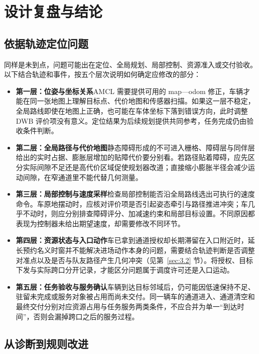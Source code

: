 \clearpage

\section{设计复盘与结论}\label{sec:7}

\subsection{依据轨迹定位问题}\label{sec:7.1}

同样是未到点，问题可能出在定位、全局规划、局部控制、资源准入或交付验收。以下结合轨迹和事件，按五个层次说明如何确定应修改的部分：
\begin{itemize}
\item \textbf{第一层：位姿与坐标关系}\quad AMCL 需要提供可用的 map—odom 修正，车辆才能在同一张地图上理解目标点、代价地图和传感器扫描。如果这一层不稳定，全局路线即使在地图上正确，也可能在车体坐标下落到错误方向，此时调整 DWB 评价项没有意义。定位结果为后续规划提供共同参考，任务完成仍由验收条件判断。
\item \textbf{第二层：全局路径与代价地图}\quad 静态障碍形成的不可进入栅格、障碍层与同伴层给出的实时占据、膨胀层增加的贴障代价要分别看。若路径贴着障碍，应先区分实际间隙不足还是高代价区域促使规划器改道；直接缩小膨胀半径会减少运动间隙，在窄通道里不能代替几何测量。
\item \textbf{第三层：局部控制与速度采样}\quad 检查局部控制能否沿全局路线选出可执行的速度命令。车原地摆动时，应核对评价项是否引起姿态牵引与路径推进冲突；车几乎不动时，则应分别排查障碍评分、加减速约束和局部目标设置。不同原因都表现为控制器未给出期望速度，却需要修改不同环节。
\item \textbf{第四层：资源状态与入口动作}\quad 车已拿到通道授权却长期滞留在入口附近时，延长预约名义时窗并不能解决进场动作本身的问题，需要结合轨迹判断是否调整对准点以及是否与队友路径产生几何冲突（见第~\ref{sec:3.2} 节）。将授权、目标下发与实际跨口分开记录，才能区分问题属于调度许可还是入口运动。
\item \textbf{第五层：任务验收与服务确认}\quad 车辆到达目标邻域后，仍可能因低速保持不足、驻留未完成或服务对象被占用而尚未交付。同一辆车的通道进入、通道清空和最终交付分别对应资源占用与任务服务两类条件，不应合并为单一“到达时间”，否则会漏掉跨口之后的服务过程。
\end{itemize}

\subsection{从诊断到规则改进}\label{sec:7.2}

